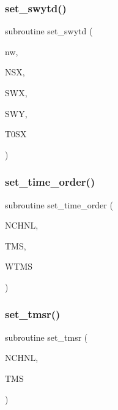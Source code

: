 \subsubsection{\texorpdfstring{set\+\_\+swytd()}{set\_swytd()}}
{\footnotesize\ttfamily subroutine set\+\_\+swytd (\begin{DoxyParamCaption}\item[{integer}]{nw,  }\item[{integer, intent(in)}]{N\+SX,  }\item[{real, dimension(nsx), intent(in)}]{S\+WX,  }\item[{real, dimension(nsx,3), intent(inout)}]{S\+WY,  }\item[{real}]{T0\+SX }\end{DoxyParamCaption})}

\mbox{\label{Leroi__c_8f90_ab7ca289c09589698d4ff1bd15e1a16e6}} 
\subsubsection{\texorpdfstring{set\+\_\+time\+\_\+order()}{set\_time\_order()}}
{\footnotesize\ttfamily subroutine set\+\_\+time\+\_\+order (\begin{DoxyParamCaption}\item[{integer}]{N\+C\+H\+NL,  }\item[{real, dimension(nchnl)}]{T\+MS,  }\item[{real, dimension(nchnl)}]{W\+T\+MS }\end{DoxyParamCaption})}

\mbox{\label{Leroi__c_8f90_a404aa1badfba9369219343ec158c37ca}} 
\subsubsection{\texorpdfstring{set\+\_\+tmsr()}{set\_tmsr()}}
{\footnotesize\ttfamily subroutine set\+\_\+tmsr (\begin{DoxyParamCaption}\item[{integer}]{N\+C\+H\+NL,  }\item[{real, dimension(nchnl)}]{T\+MS }\end{DoxyParamCaption})}

